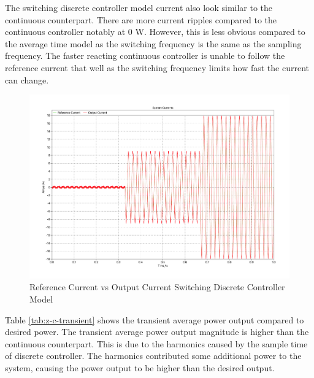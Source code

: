 \documentclass[12pt]{article}
\begin{document}
The switching discrete controller model current also look similar to the continuous counterpart.
There are more current ripples compared to the continuous controller notably at 0 W.
However, this is less obvious compared to the average time model as the switching frequency is the same as the sampling frequency.
The faster reacting continuous controller is unable to follow the reference current that well as the switching frequency limits how fast the current can change.

\begin{figure}[ht]
    \centering{}
    \includegraphics[width=\textwidth, height=0.4\textheight, keepaspectratio]{img/Switching Z-C Current.pdf}
    \caption{Reference Current vs Output Current Switching Discrete Controller Model}
    \label{fig:switching-z-c-current}
\end{figure}

Table \ref{tab:z-c-transient} shows the transient average power output compared to desired power.
The transient average power output magnitude is higher than the continuous counterpart.
This is due to the harmonics caused by the sample time of discrete controller.
The harmonics contributed some additional power to the system, causing the power output to be higher than the desired output.
\end{document}
